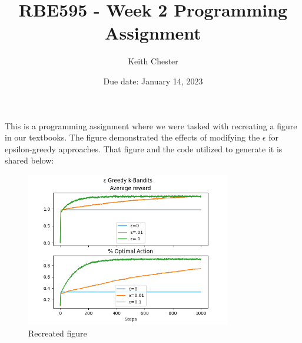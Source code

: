\documentclass{article}
\title{RBE595 - Week 2 Programming Assignment}
\author{Keith Chester}
\date{Due date: January 14, 2023}
\begin{document}
\maketitle

This is a programming assignment where we were tasked with recreating a figure in our textbooks. The figure demonstrated the effects of modifying the $\epsilon$ for epsilon-greedy approaches. That figure and the code utilized to generate it is shared below:


\begin{figure}[H]
    \centering
    \includegraphics[width = 0.8\textwidth]{./epsilon_greedy.png}
    \caption{Recreated figure}
    \label{fig:chart}
\end{figure}
\end{document}
